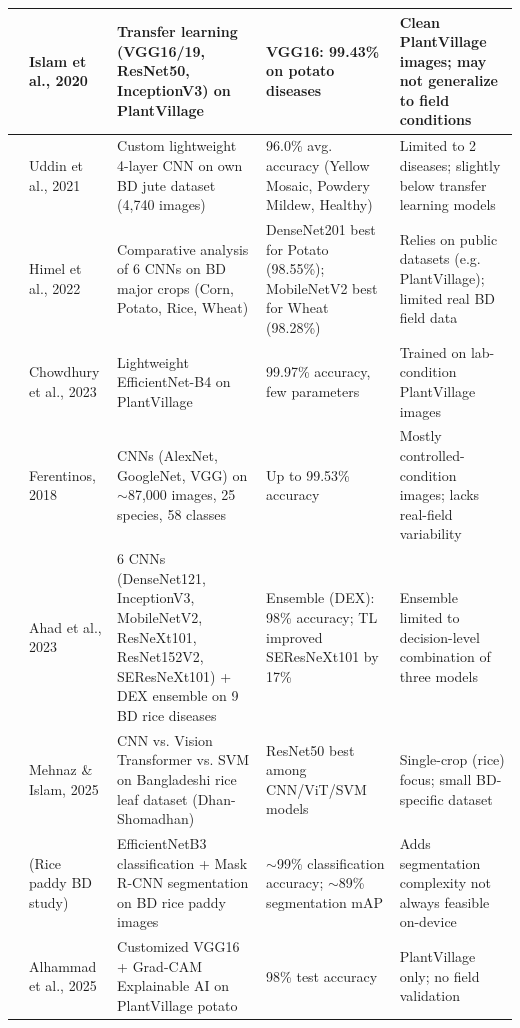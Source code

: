 {\begin{longtable}{|c|p{2.6cm}|p{3.4cm}|p{3.2cm}|p{3.4cm}|}
\cite{islam2020potato} & Islam et al., 2020 & Transfer learning (VGG16/19, ResNet50, InceptionV3) on PlantVillage & VGG16: 99.43\% on potato diseases & Clean PlantVillage images; may not generalize to field conditions \\ \hline
\cite{uddin2021jute} & Uddin et al., 2021 & Custom lightweight 4-layer CNN on own BD jute dataset (4,740 images) & 96.0\% avg. accuracy (Yellow Mosaic, Powdery Mildew, Healthy) & Limited to 2 diseases; slightly below transfer learning models \\ \hline
\cite{himel2022bdcrops} & Himel et al., 2022 & Comparative analysis of 6 CNNs on BD major crops (Corn, Potato, Rice, Wheat) & DenseNet201 best for Potato (98.55\%); MobileNetV2 best for Wheat (98.28\%) & Relies on public datasets (e.g. PlantVillage); limited real BD field data \\ \hline
\cite{chowdhury2023lightweight} & Chowdhury et al., 2023 & Lightweight EfficientNet-B4 on PlantVillage & 99.97\% accuracy, few parameters & Trained on lab-condition PlantVillage images \\ \hline
\cite{ferentinos2018deep} & Ferentinos, 2018 & CNNs (AlexNet, GoogleNet, VGG) on $\sim$87,000 images, 25 species, 58 classes & Up to 99.53\% accuracy & Mostly controlled-condition images; lacks real-field variability \\ \hline
\cite{ahad2023rice} & Ahad et al., 2023 & 6 CNNs (DenseNet121, InceptionV3, MobileNetV2, ResNeXt101, ResNet152V2, SEResNeXt101) + DEX ensemble on 9 BD rice diseases & Ensemble (DEX): 98\% accuracy; TL improved SEResNeXt101 by 17\% & Ensemble limited to decision-level combination of three models \\ \hline
\cite{mehnaz2025dhanshomadhan} & Mehnaz \& Islam, 2025 & CNN vs. Vision Transformer vs. SVM on Bangladeshi rice leaf dataset (Dhan-Shomadhan) & ResNet50 best among CNN/ViT/SVM models & Single-crop (rice) focus; small BD-specific dataset \\ \hline
\cite{ricepaddy_efficientnetb3_maskrcnn} & (Rice paddy BD study) & EfficientNetB3 classification + Mask R-CNN segmentation on BD rice paddy images & $\sim$99\% classification accuracy; $\sim$89\% segmentation mAP & Adds segmentation complexity not always feasible on-device \\ \hline
\cite{alhammad2025potatoxai} & Alhammad et al., 2025 & Customized VGG16 + Grad-CAM Explainable AI on PlantVillage potato & 98\% test accuracy & PlantVillage only; no field validation \\ \hline

\end{longtable}}
